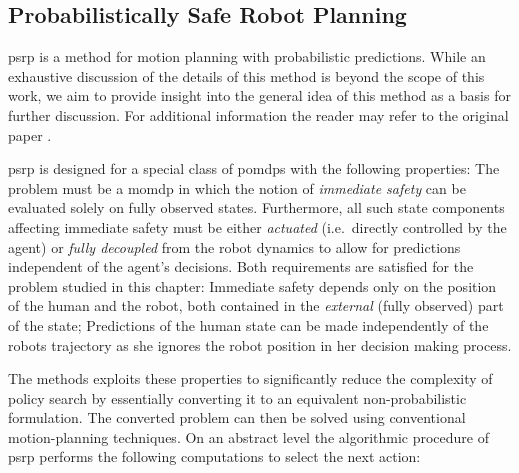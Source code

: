 
\subsection{Probabilistically Safe Robot Planning}\label{sec:hri-baseline}

\acf{psrp} is a method for motion planning with probabilistic predictions.
While an exhaustive discussion of the details of this method is beyond the
scope of this work, we aim to provide insight into the general idea of this
method as a basis for further discussion. For additional information the reader
may refer to the original paper \cite{fisac2018probabilistically}.

\ac{psrp} is designed for a special class of \acp{pomdp} with the following
properties: The problem must be a \ac{momdp} in which the notion of
\emph{immediate safety} can be evaluated solely on fully observed states.
Furthermore, all such state components affecting immediate safety must be
either \emph{actuated} (i.e. directly controlled by the agent) or \emph{fully
decoupled} from the robot dynamics to allow for predictions independent of the
agent's decisions. Both requirements are satisfied for the problem studied in
this chapter: Immediate safety depends only on the position of the human and
the robot, both contained in the \emph{external} (fully observed) part of the
state; Predictions of the human state can be made independently of the robots
trajectory as she ignores the robot position in her decision making process.

The methods exploits these properties to significantly reduce the complexity of
policy search by essentially converting it to an equivalent non-probabilistic
formulation. The converted problem can then be solved using conventional
motion-planning techniques. On an abstract level the algorithmic procedure of
\ac{psrp} performs the following computations to select the next action:

